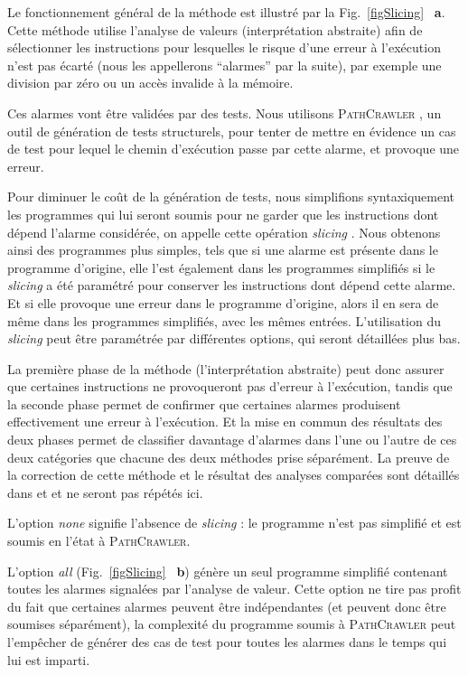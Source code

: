 \documentclass[french]{spimufcphdthesis}
\begin{document}
Le fonctionnement général de la méthode est illustré par la
Fig.~\ref{figSlicing} ~\textbf{a}. Cette méthode utilise l'analyse de valeurs
(interprétation abstraite) afin de sélectionner les instructions pour lesquelles
le risque d'une erreur à l'exécution n'est pas écarté (nous les appellerons
``alarmes'' par la suite), par exemple une division par zéro ou un accès
invalide à la mémoire.

Ces alarmes vont être validées par des tests. Nous utilisons
\textsc{PathCrawler} \cite{PathCrawler}, un outil de génération de tests
structurels, pour tenter de mettre en évidence un cas de test pour lequel le
chemin d'exécution passe par cette alarme, et provoque une erreur.

Pour diminuer le coût de la génération de tests, nous simplifions
syntaxiquement les programmes qui lui seront soumis pour ne garder que les
instructions dont dépend l'alarme considérée, on appelle cette opération
{\em slicing} \cite{slicing}. Nous obtenons ainsi des programmes plus simples,
tels que si une alarme est présente dans le programme d'origine, elle l'est
également dans les programmes simplifiés si le {\em slicing} a été paramétré
pour conserver les instructions dont dépend cette alarme. Et si elle provoque
une erreur dans le programme d'origine, alors il en sera de même dans les
programmes simplifiés, avec les mêmes entrées. L'utilisation du {\em slicing}
peut être paramétrée par différentes options, qui seront détaillées plus bas.

La première phase de la méthode (l'interprétation abstraite) peut donc assurer
que certaines instructions ne provoqueront pas d'erreur à l'exécution, tandis
que la seconde phase permet de confirmer que certaines alarmes produisent
effectivement une erreur à l'exécution. Et la mise en commun des résultats des
deux phases permet de classifier davantage d'alarmes dans l'une ou l'autre de
ces deux catégories que chacune des deux méthodes prise séparément. La preuve de
la correction de cette méthode et le résultat des analyses comparées sont
détaillés dans \cite{TheseOmar} et \cite{SANTE} et ne seront pas répétés ici.



L'option {\em none} signifie l'absence de {\em slicing} : le programme n'est pas
simplifié et est soumis en l'état à \textsc{PathCrawler}.

L'option {\em all} (Fig.~\ref{figSlicing} ~\textbf{b}) génère un seul programme
simplifié contenant toutes les alarmes signalées par l'analyse de valeur. Cette
option ne tire pas profit du fait que certaines alarmes peuvent être
indépendantes (et peuvent donc être soumises séparément), la complexité du
programme soumis à \textsc{PathCrawler} peut l'empêcher de générer des cas de
test pour toutes les alarmes dans le temps qui lui est imparti.
\end{document}
